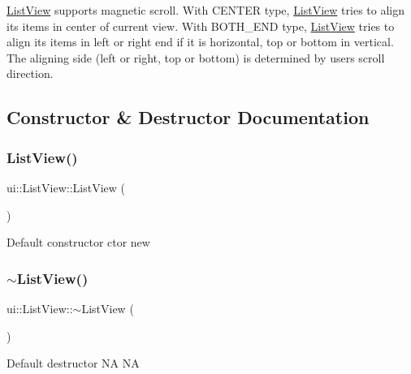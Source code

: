 \hyperlink{classui_1_1ListView}{List\+View} supports magnetic scroll. With C\+E\+N\+T\+ER type, \hyperlink{classui_1_1ListView}{List\+View} tries to align its items in center of current view. With B\+O\+T\+H\+\_\+\+E\+ND type, \hyperlink{classui_1_1ListView}{List\+View} tries to align its items in left or right end if it is horizontal, top or bottom in vertical. The aligning side (left or right, top or bottom) is determined by user\textquotesingle{}s scroll direction. 

\subsection{Constructor \& Destructor Documentation}
\mbox{\label{classui_1_1ListView_a51ad2443dcfbd766ace32060e102f706}} 
\subsubsection{\texorpdfstring{List\+View()}{ListView()}\hspace{0.1cm}{\footnotesize\ttfamily [1/2]}}
{\footnotesize\ttfamily ui\+::\+List\+View\+::\+List\+View (\begin{DoxyParamCaption}{ }\end{DoxyParamCaption})}

Default constructor  ctor  new \mbox{\label{classui_1_1ListView_acd8c9c5b0bd4ef6166c056798665c08d}} 
\subsubsection{\texorpdfstring{$\sim$\+List\+View()}{~ListView()}\hspace{0.1cm}{\footnotesize\ttfamily [1/2]}}
{\footnotesize\ttfamily ui\+::\+List\+View\+::$\sim$\+List\+View (\begin{DoxyParamCaption}{ }\end{DoxyParamCaption})\hspace{0.3cm}{\ttfamily [virtual]}}

Default destructor  NA  NA \mbox{\label{classui_1_1ListView_a51ad2443dcfbd766ace32060e102f706}} 

